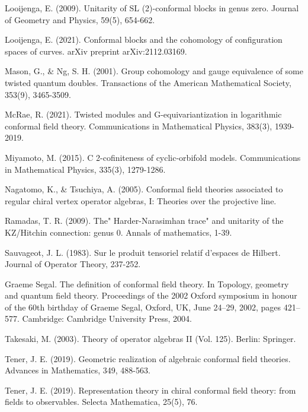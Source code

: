 \documentclass[11pt,b5paper,notitlepage]{article}
\theoremstyle{definition}
\theoremstyle{plain}
\numberwithin{equation}{section}
\begin{document}
\begin{thebibliography}{999999}
Looijenga, E. (2009). Unitarity of SL (2)-conformal blocks in genus zero. Journal of Geometry and Physics, 59(5), 654-662.


Looijenga, E. (2021). Conformal blocks and the cohomology of configuration spaces of curves. arXiv preprint arXiv:2112.03169.


Mason, G., \& Ng, S. H. (2001). Group cohomology and gauge equivalence of some twisted quantum doubles. Transactions of the American Mathematical Society, 353(9), 3465-3509.



McRae, R. (2021). Twisted modules and G-equivariantization in logarithmic conformal field theory. Communications in Mathematical Physics, 383(3), 1939-2019.


Miyamoto, M. (2015). C 2-cofiniteness of cyclic-orbifold models. Communications in Mathematical Physics, 335(3), 1279-1286.



Nagatomo, K., \& Tsuchiya, A. (2005). Conformal field theories associated to regular chiral vertex operator algebras, I: Theories over the projective line.


Ramadas, T. R. (2009). The" Harder-Narasimhan trace" and unitarity of the KZ/Hitchin connection: genus 0. Annals of mathematics, 1-39.



Sauvageot, J. L. (1983). Sur le produit tensoriel relatif d'espaces de Hilbert. Journal of Operator Theory, 237-252.


Graeme Segal. The definition of conformal field theory. In Topology, geometry and quantum field theory. Proceedings of the 2002 Oxford symposium in honour of the 60th birthday of Graeme Segal, Oxford, UK, June 24–29, 2002, pages 421–577. Cambridge: Cambridge University Press, 2004.


Takesaki, M. (2003). Theory of operator algebras II (Vol. 125). Berlin: Springer.

Tener, J. E. (2019). Geometric realization of algebraic conformal field theories. Advances in Mathematics, 349, 488-563.

Tener, J. E. (2019). Representation theory in chiral conformal field theory: from fields to observables. Selecta Mathematica, 25(5), 76.





\end{thebibliography}
\end{document}
